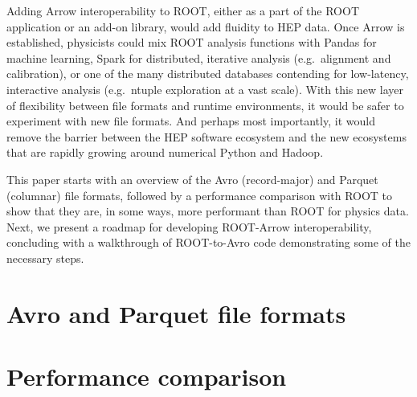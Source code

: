 \documentclass{article}
\begin{document}
Adding Arrow interoperability to ROOT, either as a part of the ROOT application or an add-on library, would add fluidity to HEP data. Once Arrow is established, physicists could mix ROOT analysis functions with Pandas for machine learning, Spark for distributed, iterative analysis (e.g.\ alignment and calibration), or one of the many distributed databases contending for low-latency, interactive analysis (e.g.\ ntuple exploration at a vast scale). With this new layer of flexibility between file formats and runtime environments, it would be safer to experiment with new file formats. And perhaps most importantly, it would remove the barrier between the HEP software ecosystem and the new ecosystems that are rapidly growing around numerical Python and Hadoop.

This paper starts with an overview of the Avro (record-major) and Parquet (columnar) file formats, followed by a performance comparison with ROOT to show that they are, in some ways, more performant than ROOT for physics data. Next, we present a roadmap for developing ROOT-Arrow interoperability, concluding with a walkthrough of ROOT-to-Avro code demonstrating some of the necessary steps.

\section*{Avro and Parquet file formats}





\pagebreak

\section*{Performance comparison}
\end{document}
